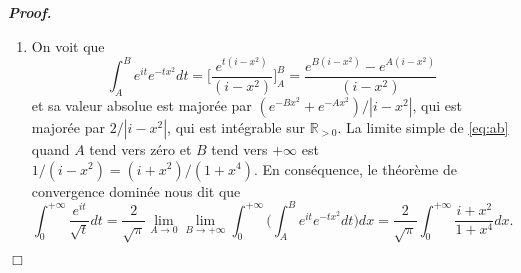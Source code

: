 \documentclass[11pt,a4paper]{article}
\newcommand{\RR}{\mathbb{R}}
\newenvironment{preuve}[1][]
{\vskip 2mm  \noindent\emph{\bf Proof#1. }}{$\Box$ \vskip 2mm}
\begin{document}
\begin{preuve}
\begin{enumerate}
				\item On voit que 
				\begin{equation}
				\label{eq:ab}
				\int_A^B e^{it}e^{-tx^2} dt = \bigg[ \frac{e^{t(i-x^2)}}{(i-x^2)} \bigg]_{A}^{B} = \frac{e^{B(i-x^2)} - e^{A(i-x^2)}}{(i-x^2)}    
				\end{equation}      
				et sa valeur absolue est majorée par $(e^{- B x^{2}} + e^{- A x^{2}} )/|i-x^{2}|$, qui est majorée par $2/|i-x^{2}|$, qui est intégrable sur $\RR_{>0}$. 
				La limite simple de \eqref{eq:ab} quand $A$ tend vers zéro et $B$ tend vers $+ \infty$ est $1/(i-x^{2}) = (i+x^{2})/(1+x^{4})$. 
				En conséquence, le théorème de convergence dominée nous dit que 
				\[     \int_0^{+\infty}\frac{e^{it}}{\sqrt{t}}dt=\frac{2}{\sqrt{\pi}} \underset{A \rightarrow 0}{\lim} \underset{B \rightarrow + \infty}{\lim} \int_0^{+\infty}\bigg(\int_A^Be^{it}e^{-tx^2} dt\bigg)dx = \frac{2}{\sqrt{\pi}} \int_0^{+\infty} \frac{i+x^2}{1+x^4} dx.     \]
				

\end{enumerate}
\end{preuve}
\end{document}
